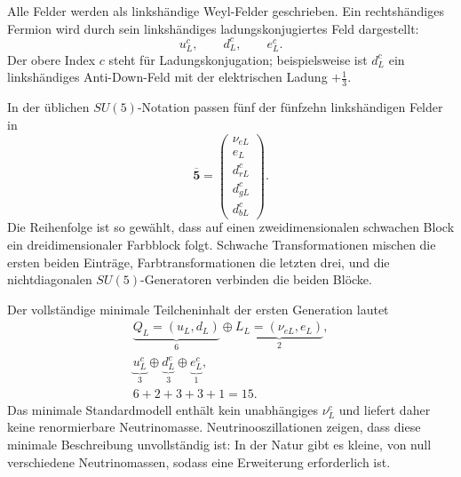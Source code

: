 Alle Felder werden als linkshändige Weyl-Felder geschrieben. Ein rechtshändiges Fermion wird durch sein linkshändiges ladungskonjugiertes Feld dargestellt:
\begin{equation}
u^c_L,\qquad d^c_L,\qquad e^c_L.
\label{eq:l10-left-handed-bookkeeping}
\end{equation}
Der obere Index \(c\) steht für Ladungskonjugation; beispielsweise ist \(d^c_L\) ein linkshändiges Anti-Down-Feld mit der elektrischen Ladung \(+\tfrac13\).

In der üblichen \(SU(5)\)-Notation passen fünf der fünfzehn linkshändigen Felder in
\begin{equation}
\overline{\mathbf5}
=
\begin{pmatrix}
\nu_{eL}\\
e_L\\
d^c_{rL}\\
d^c_{gL}\\
d^c_{bL}
\end{pmatrix}.
\label{eq:l10-fivebar}
\end{equation}
Die Reihenfolge ist so gewählt, dass auf einen zweidimensionalen schwachen Block ein dreidimensionaler Farbblock folgt. Schwache Transformationen mischen die ersten beiden Einträge, Farbtransformationen die letzten drei, und die nichtdiagonalen \(SU(5)\)-Generatoren verbinden die beiden Blöcke.


Der vollständige minimale Teilcheninhalt der ersten Generation lautet
\begin{equation}
\begin{gathered}
\underbrace{Q_L=(u_L,d_L)}_{6}
\oplus
\underbrace{L_L=(\nu_{eL},e_L)}_{2},\\
\underbrace{u^c_L}_{3}
\oplus
\underbrace{d^c_L}_{3}
\oplus
\underbrace{e^c_L}_{1},\\
6+2+3+3+1=15.
\end{gathered}
\label{eq:l10-fifteen}
\end{equation}
Das minimale Standardmodell enthält kein unabhängiges \(\nu^c_L\) und liefert daher keine renormierbare Neutrinomasse. Neutrinooszillationen zeigen, dass diese minimale Beschreibung unvollständig ist: In der Natur gibt es kleine, von null verschiedene Neutrinomassen, sodass eine Erweiterung erforderlich ist.

